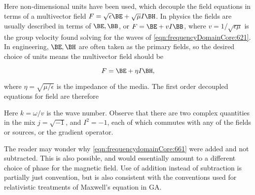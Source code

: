 Here non-dimensional units have been used, which decouple the field equations in terms of a multivector field \( F = \sqrt{\epsilon} \BE + \sqrt{\mu} I \BH \).
In physics the fields are usually described in terms of \( \BE, \BB \), or \( F = \BE + v I \BB \), where \( v = 1/\sqrt{\epsilon\mu} \) is the group velocity found solving for the waves of \cref{eqn:frequencyDomainCore:621}.  In engineering, \( \BE, \BH \) are often taken as the primary fields, so the desired choice of units means the multivector field should be

\begin{dmath}\label{eqn:frequencydomainCore:80}
F = \BE + \eta I \BH,
\end{dmath}

where \( \eta = \sqrt{\mu/\epsilon} \) is the impedance of the media.  The first order decoupled equations for field are therefore


Here \( k = \omega/v \) is the wave number.
Observe that there are two complex quantities in the mix \( j = \sqrt{-1} \), and \( I^2 = -1 \), each of which commutes with any of the fields or sources, or the gradient operator.

The reader may wonder why \cref{eqn:frequencydomainCore:661} were added and not subtracted.  This is also possible, and would essentially amount to a different choice of phase for the magnetic field.  Use of addition instead of subtraction is partially just convention, but is also consistent with the conventions used for relativistic treatments of Maxwell's equation in GA.
